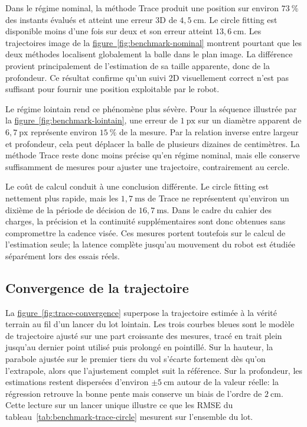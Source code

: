 \documentclass[a4paper,11pt]{report}
\newcommand{\figref}[1]{\hyperref[#1]{figure~\ref*{#1}}}
\begin{document}
Dans le régime nominal, la méthode Trace produit une position sur environ
\(73~\%\) des instants évalués et atteint une erreur 3D de \(4{,}5~\text{cm}\).
Le circle fitting est disponible moins d'une fois sur deux et son erreur atteint
\(13{,}6~\text{cm}\). Les trajectoires image de la
\figref{fig:benchmark-nominal} montrent pourtant que les deux méthodes localisent
globalement la balle dans le plan image. La différence provient principalement
de l'estimation de sa taille apparente, donc de la profondeur. Ce résultat
confirme qu'un suivi 2D visuellement correct n'est pas suffisant pour fournir
une position exploitable par le robot.

Le régime lointain rend ce phénomène plus sévère. Pour la séquence illustrée par
la \figref{fig:benchmark-lointain}, une erreur de \(1~\text{px}\) sur un diamètre
apparent de \(6{,}7~\text{px}\) représente environ \(15~\%\) de la mesure. Par
la relation inverse entre largeur et profondeur, cela peut déplacer la balle de
plusieurs dizaines de centimètres. La méthode Trace reste donc moins précise
qu'en régime nominal, mais elle conserve suffisamment de mesures pour ajuster
une trajectoire, contrairement au cercle.

Le coût de calcul conduit à une conclusion différente. Le circle fitting est
nettement plus rapide, mais les \(1{,}7~\text{ms}\) de Trace ne représentent
qu'environ un dixième de la période de décision de \(16{,}7~\text{ms}\). Dans le
cadre du cahier des charges, la précision et la continuité supplémentaires sont
donc obtenues sans compromettre la cadence visée. Ces mesures portent toutefois
sur le calcul de l'estimation seule; la latence complète jusqu'au mouvement du
robot est étudiée séparément lors des essais réels.

\subsection{Convergence de la trajectoire}

La \figref{fig:trace-convergence} superpose la trajectoire estimée à la vérité
terrain au fil d'un lancer du lot lointain. Les trois courbes bleues sont le
modèle de trajectoire ajusté sur une part croissante des mesures, tracé en trait
plein jusqu'au dernier point utilisé puis prolongé en pointillé. Sur la hauteur,
la parabole ajustée sur le premier tiers du vol s'écarte fortement dès qu'on
l'extrapole, alors que l'ajustement complet suit la référence. Sur la
profondeur, les estimations restent dispersées d'environ \(\pm 5~\text{cm}\)
autour de la valeur réelle: la régression retrouve la bonne pente mais conserve
un biais de l'ordre de \(2~\text{cm}\). Cette lecture sur un lancer unique
illustre ce que les RMSE du tableau~\ref{tab:benchmark-trace-circle} mesurent
sur l'ensemble du lot.
\end{document}
